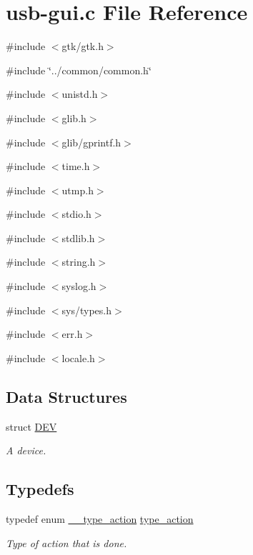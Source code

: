 \hypertarget{usb-gui_8c}{
\section{usb-\/gui.c File Reference}
\label{usb-gui_8c}
}
{\ttfamily \#include $<$gtk/gtk.h$>$}\par
{\ttfamily \#include \char`\"{}../common/common.h\char`\"{}}\par
{\ttfamily \#include $<$unistd.h$>$}\par
{\ttfamily \#include $<$glib.h$>$}\par
{\ttfamily \#include $<$glib/gprintf.h$>$}\par
{\ttfamily \#include $<$time.h$>$}\par
{\ttfamily \#include $<$utmp.h$>$}\par
{\ttfamily \#include $<$stdio.h$>$}\par
{\ttfamily \#include $<$stdlib.h$>$}\par
{\ttfamily \#include $<$string.h$>$}\par
{\ttfamily \#include $<$syslog.h$>$}\par
{\ttfamily \#include $<$sys/types.h$>$}\par
{\ttfamily \#include $<$err.h$>$}\par
{\ttfamily \#include $<$locale.h$>$}\par
\subsection*{Data Structures}
\begin{DoxyCompactItemize}
\item 
struct \hyperlink{structDEV}{DEV}
\begin{DoxyCompactList}\small\item\em A device. \item\end{DoxyCompactList}\end{DoxyCompactItemize}
\subsection*{Typedefs}
\begin{DoxyCompactItemize}
\item 
\hypertarget{usb-gui_8c_a7087a47396ef40703f1d194807d4ff1f}{
typedef enum \hyperlink{usb-gui_8c_a4a517367fd55e0e2fab7fa26d5f6cc57}{\_\-\_\-type\_\-action} \hyperlink{usb-gui_8c_a7087a47396ef40703f1d194807d4ff1f}{type\_\-action}}
\label{usb-gui_8c_a7087a47396ef40703f1d194807d4ff1f}

\begin{DoxyCompactList}\small\item\em Type of action that is done. \item\end{DoxyCompactList}\end{DoxyCompactItemize}
